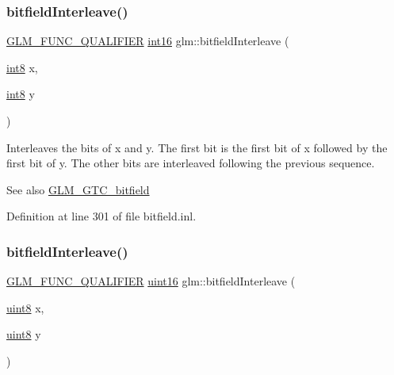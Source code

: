 \subsubsection{\texorpdfstring{bitfieldInterleave()}{bitfieldInterleave()}\hspace{0.1cm}{\footnotesize\ttfamily [1/16]}}
{\footnotesize\ttfamily \mbox{\hyperlink{setup_8hpp_a33fdea6f91c5f834105f7415e2a64407}{G\+L\+M\+\_\+\+F\+U\+N\+C\+\_\+\+Q\+U\+A\+L\+I\+F\+I\+ER}} \mbox{\hyperlink{group__gtc__type__precision_ga2945a61d12771f8954994fcddf02b021}{int16}} glm\+::bitfield\+Interleave (\begin{DoxyParamCaption}\item[{\mbox{\hyperlink{group__gtc__type__precision_ga96254f9c1c4506fc8eb5cf3301ce8565}{int8}}}]{x,  }\item[{\mbox{\hyperlink{group__gtc__type__precision_ga96254f9c1c4506fc8eb5cf3301ce8565}{int8}}}]{y }\end{DoxyParamCaption})}

Interleaves the bits of x and y. The first bit is the first bit of x followed by the first bit of y. The other bits are interleaved following the previous sequence.

\begin{DoxySeeAlso}{See also}
\mbox{\hyperlink{group__gtc__bitfield}{G\+L\+M\+\_\+\+G\+T\+C\+\_\+bitfield}} 
\end{DoxySeeAlso}


Definition at line 301 of file bitfield.\+inl.

\mbox{\label{group__gtc__bitfield_ga0700a3ceb088a0ecc23d76c154096061}} 
\subsubsection{\texorpdfstring{bitfieldInterleave()}{bitfieldInterleave()}\hspace{0.1cm}{\footnotesize\ttfamily [2/16]}}
{\footnotesize\ttfamily \mbox{\hyperlink{setup_8hpp_a33fdea6f91c5f834105f7415e2a64407}{G\+L\+M\+\_\+\+F\+U\+N\+C\+\_\+\+Q\+U\+A\+L\+I\+F\+I\+ER}} \mbox{\hyperlink{group__gtc__type__precision_gad8c2939e1fdd8e5828b31d95c52255d5}{uint16}} glm\+::bitfield\+Interleave (\begin{DoxyParamCaption}\item[{\mbox{\hyperlink{group__gtc__type__precision_ga1a7dcd8aac97cc8020817c94049deff2}{uint8}}}]{x,  }\item[{\mbox{\hyperlink{group__gtc__type__precision_ga1a7dcd8aac97cc8020817c94049deff2}{uint8}}}]{y }\end{DoxyParamCaption})}

